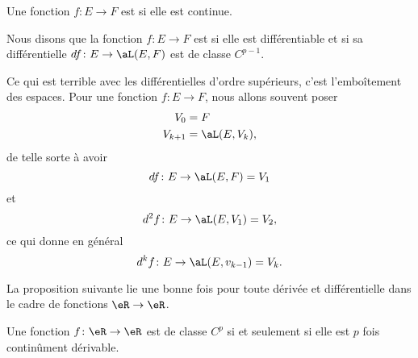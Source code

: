 \begin{definition}
    Une fonction \( f\colon E\to F\) est  si elle est continue.

    Nous disons que la fonction \( f\colon E\to F\) est  si elle est différentiable et si sa différentielle \( df\colon E\to \aL(E,F)\) est de classe \( C^{p-1}\).
\end{definition}

Ce qui est terrible avec les différentielles d'ordre supérieurs, c'est l'emboîtement des espaces. Pour une fonction \( f\colon E\to F\), nous allons souvent poser
\begin{subequations}
    \begin{align}
        V_0&=F\\
        V_{k+1}&=\aL(E,V_k),
    \end{align}
\end{subequations}
de telle sorte à avoir
\begin{equation}
    df\colon E\to \aL(E,F)=V_1
\end{equation}
et 
\begin{equation}
    d^2f\colon E\to \aL(E,V_1)=V_2,
\end{equation}
ce qui donne en général
\begin{equation}
    d^kf\colon E\to \aL(E,v_{k-1})=V_k.
\end{equation}

La proposition suivante lie une bonne fois pour toute dérivée et différentielle dans le cadre de fonctions \( \eR\to \eR\).
\begin{proposition}      \label{PROPooCNDHooKRwils}
    Une fonction \( f\colon \eR\to \eR\) est de classe \( C^p\) si et seulement si elle est \( p\) fois continûment dérivable.
\end{proposition}

